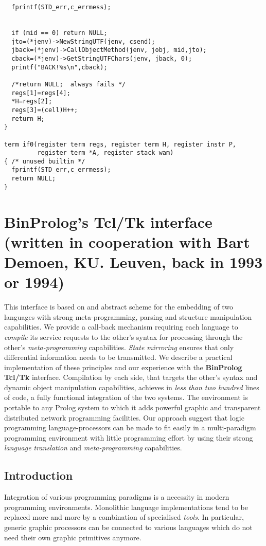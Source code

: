\documentclass{article}
\begin{document}
{\begin{verbatim}
  fprintf(STD_err,c_errmess);

  
  if (mid == 0) return NULL;
  jto=(*jenv)->NewStringUTF(jenv, csend);
  jback=(*jenv)->CallObjectMethod(jenv, jobj, mid,jto);
  cback=(*jenv)->GetStringUTFChars(jenv, jback, 0);
  printf("BACK!%s\n",cback);   
  
  /*return NULL;  always fails */ 
  regs[1]=regs[4];
  *H=regs[2];
  regs[3]=(cell)H++;
  return H;  
}

term if0(register term regs, register term H, register instr P, 
         register term *A, register stack wam)
{ /* unused builtin */
  fprintf(STD_err,c_errmess);
  return NULL;
}
\end{verbatim}}

\section{BinProlog's Tcl/Tk interface (written in cooperation with Bart Demoen, KU. Leuven, back in 1993 or 1994)}

This interface is based on and abstract scheme for the embedding of two languages with
strong meta-programming, parsing and structure manipulation
capabilities.  We provide a call-back mechanism requiring each language
to {\em compile} its service requests to the other's syntax for processing
through the other's {\em meta-programming}
capabilities. {\em State mirroring} ensures
that only differential information needs to be transmitted.  We
describe a practical implementation of these principles and our
experience with the {\bf BinProlog Tcl/Tk} interface. 
Compilation by each side, that targets
the other's syntax and dynamic object manipulation capabilities,
achieves in {\em less than two hundred} 
lines of code, a fully functional integration
of the two systems. The environment
is portable to any Prolog system to which it
adds powerful graphic and transparent distributed
network programming facilities.
Our approach suggest that logic programming language-processors
can be made to fit easily in a multi-paradigm programming environment
with little programming effort by using their
strong {\em language translation} and {\em meta-programming}
capabilities.

\subsection{Introduction}

Integration of various programming paradigms is a necessity
in modern programming environments. 
Monolithic language implementations tend to be replaced more and more
by a combination of specialised {\em tools}.
In particular, generic graphic processors can be connected
to various languages which do not need 
their own graphic primitives anymore.
\end{document}
